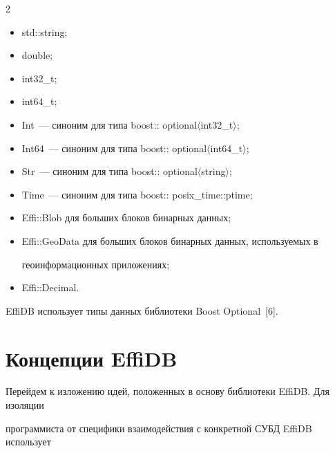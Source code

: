\begin{multicols}{2}
\begin{itemize}
\begin{itemize}
\item[--] {\sf std::string};

\item[--] {\sf double};

\item[--] {\sf int32\_t};

\item[--] {\sf int64\_t};

\item[--] {\sf Int}~--- синоним для типа {\sf boost:: optional$\langle$int32\_t$\rangle$};

\item[--] {\sf Int64}~--- синоним для типа {\sf boost:: optional$\langle$int64\_t$\rangle$};

\item[--] {\sf Str}~--- синоним для типа {\sf boost:: optional$\langle$string$\rangle$};

\item[--] {\sf Time}~--- синоним для типа {\sf boost:: posix\_time::ptime};

\item[--] {\sf Effi::Blob} для больших блоков бинарных данных;

\item[--] {\sf Effi::GeoData} для больших блоков бинарных данных, используемых в 

геоинформационных приложениях;

\item[--] {\sf Effi::Decimal}.

\end{itemize}

EffiDB использует типы данных библиотеки Boost Optional~[6].

\end{itemize}



\vspace*{-9pt}



\section{Концепции EffiDB}



\vspace*{-2pt}



Перейдем к изложению идей, положенных в основу библиотеки EffiDB. Для изоляции 

программиста от специфики взаимодействия с конкретной СУБД EffiDB использует 


\end{multicols}
